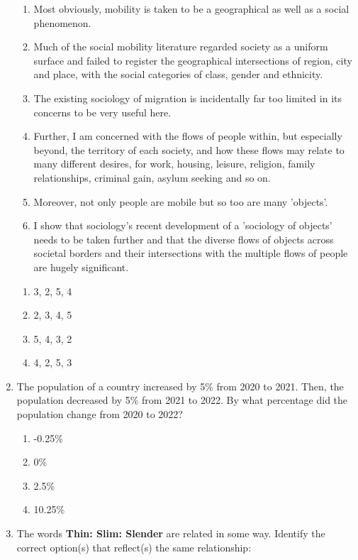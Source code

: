 \documentclass[journal,13pt,onecolumn]{exam}
\theoremstyle{remark}
\begin{document}
\begin{enumerate}[label=Q.\arabic*]
\begin{enumerate}[label=\arabic*.]
    \item Most obviously, mobility is taken to be a geographical as well as a social phenomenon.
    \item Much of the social mobility literature regarded society as a uniform surface and failed to register the geographical intersections of region, city and place, with the social categories of class, gender and ethnicity.
    \item The existing sociology of migration is incidentally far too limited in its concerns to be very useful here.
    \item Further, I am concerned with the flows of people within, but especially beyond, the territory of each society, and how these flows may relate to many different desires, for work, housing, leisure, religion, family relationships, criminal gain, asylum seeking and so on.
    \item Moreover, not only people are mobile but so too are many 'objects'.
    \item I show that sociology's recent development of a 'sociology of objects' needs to be taken further and that the diverse flows of objects across societal borders and their intersections with the multiple flows of people are hugely significant.
\end{enumerate}

\begin{enumerate}

    \item 3, 2, 5, 4
    \item 2, 3, 4, 5
    \item 5, 4, 3, 2
    \item 4, 2, 5, 3
\end{enumerate}

\item The population of a country increased by 5\% from 2020 to 2021. Then, the population decreased by 5\% from 2021 to 2022. By what percentage did the population change from 2020 to 2022?

\begin{enumerate}
    \item -0.25\%
    \item 0\%
    \item 2.5\%
    \item 10.25\%
\end{enumerate}

\item The words \textbf{Thin: Slim: Slender} are related in some way. Identify the correct option(s) that reflect(s) the same relationship:


\end{enumerate}
\end{document}
